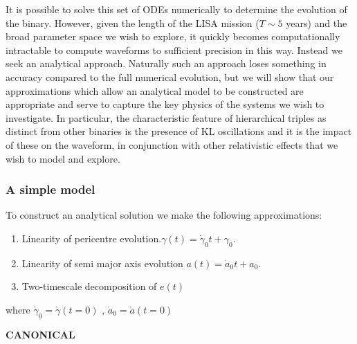 \documentclass[a4paper,fleqn,usenatbib]{mnras}
\begin{document}
\noindent It is possible to solve this set of ODEs numerically to determine the evolution of the binary. However, given the length of the LISA mission ($T \sim 5$ years) and the broad parameter space we wish to explore, it quickly becomes computationally intractable to compute waveforms to sufficient precision in this way. Instead we seek an analytical approach. Naturally such an approach loses something in accuracy compared to the full numerical evolution, but we will show that our approximations which allow an analytical model to be constructed are appropriate and serve to capture the key physics of the systems we wish to investigate. In particular, the characteristic feature of hierarchical triples as distinct from other binaries is the presence of KL oscillations and it is the impact of these on the waveform, in conjunction with other relativistic effects that we wish to model and explore. \newline

\subsubsection{A simple model}
\noindent To construct an analytical solution we make the following approximations:
\begin{enumerate}
	\item Linearity of pericentre evolution.$\gamma(t) = \dot{\gamma}_0 t + \gamma_0$.
	\item Linearity of semi major axis evolution $a(t) = \dot{a}_0 t + a_0$.
	\item Two-timescale decomposition of $e(t)$
\end{enumerate}
where $\dot{\gamma}_0 = \dot{\gamma} (t=0)$ , $\dot{a}_0 = \dot{a} (t=0)$\newline 



\textbf{CANONICAL}
\end{document}
